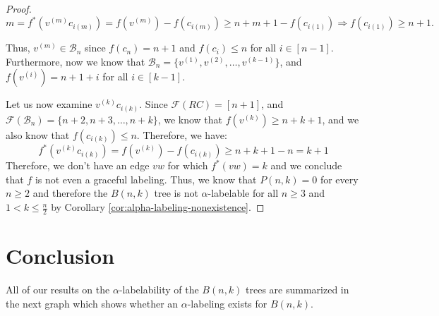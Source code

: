 \documentclass[10pt]{article}
\theoremstyle{definition}
\begin{document}
\begin{proof}
  \begin{equation*}
    m = f^*(v^{(m)} c_{i(m)}) = f(v^{(m)}) - f(c_{i(m)}) \ge n + m + 1 - f(c_{i(1)}) \Rightarrow f(c_{i(1)}) \ge n + 1.
  \end{equation*}

  Thus, $v^{(m)} \in \mathcal{B}_n$ since $f(c_n) = n + 1$ and $f(c_i) \le n$ for all $i \in [n-1]$. Furthermore, now we know that $\mathcal{B}_n = \{v^{(1)}, v^{(2)}, \dots, v^{(k-1)}\}$, and $f(v^{(i)}) = n + 1 + i$ for all $i \in [k - 1]$.

  Let us now examine $v^{(k)} c_{i(k)}$. Since $\mathcal{F}(RC) = [n + 1]$, and $\mathcal{F}(\mathcal{B}_n) = \{n+2,n+3, \dots, n + k\}$, we know that $f(v^{(k)}) \ge n + k + 1$, and we also know that $f(c_{i(k)}) \le n$. Therefore, we have:
  $$
  f^*(v^{(k)} c_{i(k)}) = f(v^{(k)}) - f(c_{i(k)}) \ge n + k + 1 - n = k + 1
  $$
  Therefore, we don't have an edge $vw$ for which $f^*(vw) = k$ and we conclude that $f$ is not even a graceful labeling. Thus, we know that $P(n, k) = 0$ for every $n \ge 2$ and therefore the $B(n, k)$ tree is not $\alpha$-labelable for all $n \geq 3$ and $1 < k \le \frac{n}{2}$ by Corollary \ref{cor:alpha-labeling-nonexistence}.
\end{proof}

\section{Conclusion}

All of our results on the $\alpha$-labelability of the $B(n,k)$ trees are summarized in the next graph which shows whether an $\alpha$-labeling exists for $B(n, k)$.
\end{document}
